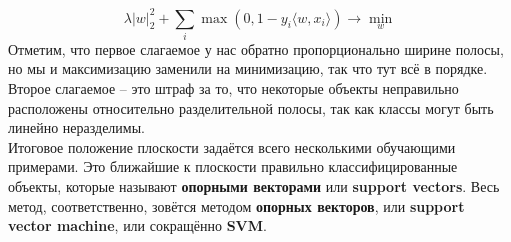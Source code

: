 $$\lambda|w|^2_2 + \sum_i \max(0, 1-y_i \langle w, x_i\rangle) \longrightarrow\min\limits_{w}$$
Отметим, что первое слагаемое у нас обратно пропорционально ширине полосы, но мы и максимизацию заменили на минимизацию, так что тут всё в порядке. Второе слагаемое – это штраф за то, что некоторые объекты неправильно расположены относительно разделительной полосы, так как классы могут быть линейно неразделимы. \\
Итоговое положение плоскости задаётся всего несколькими обучающими примерами. Это ближайшие к плоскости правильно классифицированные объекты, которые называют \textbf{опорными векторами} или \textbf{support vectors}. Весь метод, соответственно, зовётся методом \textbf{опорных векторов}, или \textbf{support vector machine}, или сокращённо \textbf{SVM}. 

